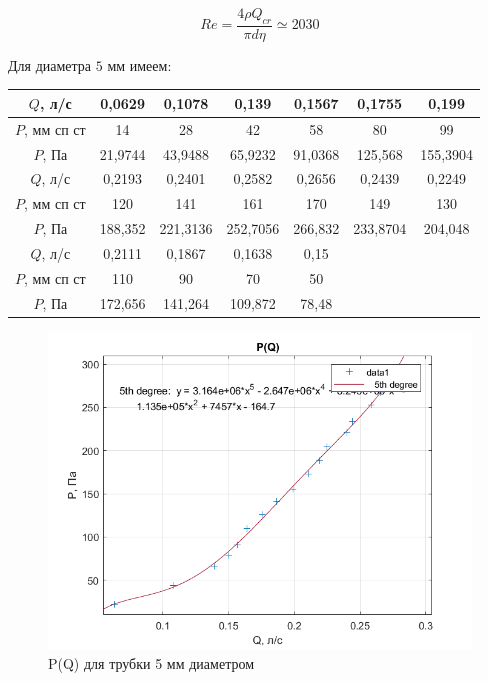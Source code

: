 \documentclass[a4paper, 12pt]{article} %
\begin{document}
\begin{equation}
	Re = \frac{4 \rho Q_{cr}}{\pi d \eta} \simeq 2030
\end{equation}

Для диаметра $5$ мм имеем:

\begin{table}[!h]
\begin{tabular}{|c|c|c|c|c|c|c|}
\hline
$Q$, л/с      & 0,0629  & 0,1078   & 0,139    & 0,1567  & 0,1755                & 0,199                 \\ \hline
$P$, мм сп ст & 14      & 28       & 42       & 58      & 80                    & 99                    \\ \hline
$P$, Па       & 21,9744 & 43,9488  & 65,9232  & 91,0368 & 125,568               & 155,3904              \\ \hline
$Q$, л/с      & 0,2193  & 0,2401   & 0,2582   & 0,2656  & 0,2439                & 0,2249                \\ \hline
$P$, мм сп ст & 120     & 141      & 161      & 170     & 149                   & 130                   \\ \hline
$P$, Па       & 188,352 & 221,3136 & 252,7056 & 266,832 & 233,8704              & 204,048               \\ \hline
$Q$, л/с      & 0,2111  & 0,1867   & 0,1638   & 0,15    & \multicolumn{1}{l|}{} & \multicolumn{1}{l|}{} \\ \hline
$P$, мм сп ст & 110     & 90       & 70       & 50      & \multicolumn{1}{l|}{} & \multicolumn{1}{l|}{} \\ \hline
$P$, Па       & 172,656 & 141,264  & 109,872  & 78,48   & \multicolumn{1}{l|}{} & \multicolumn{1}{l|}{} \\ \hline
\end{tabular}
\end{table}

\begin{figure}[!h]
    \centering
    \includegraphics[width = 12 cm]{5mm}
    \caption{P(Q) для трубки 5 мм диаметром}
    \label{fig:vac}
\end{figure}
\end{document}
